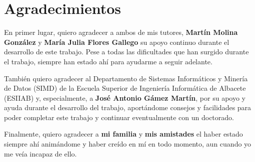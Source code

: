 \newpage

\chapter*{Agradecimientos}

En primer lugar, quiero agradecer a ambos de mis tutores, \textbf{Martín Molina González} y \textbf{María Julia Flores Gallego} su apoyo continuo durante el desarrollo de este trabajo. Pese a todas las dificultades que han surgido durante el trabajo, siempre han estado ahí para ayudarme a seguir adelante.

También quiero agradecer al Departamento de Sistemas Informáticos y Minería de Datos (SIMD) de la Escuela Superior de Ingeniería Informática de Albacete (ESIIAB) y, especialmente, a \textbf{José Antonio Gámez Martín}, por su apoyo y ayuda durante el desarrollo del trabajo, aportándome consejos y facilidades para poder completar este trabajo y continuar eventualmente con un doctorado.

Finalmente, quiero agradecer a \textbf{mi familia} y \textbf{mis amistades} el haber estado siempre ahí animándome y haber creído en mí en todo momento, aun cuando yo me veía incapaz de ello.

